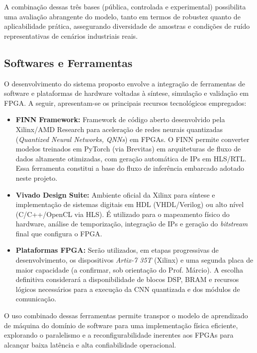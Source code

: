 A combinação dessas três bases (pública, controlada e experimental) possibilita uma avaliação abrangente do modelo, tanto em termos de robustez quanto de aplicabilidade prática, assegurando diversidade de amostras e condições de ruído representativas de cenários industriais reais.

\subsection*{Softwares e Ferramentas}

O desenvolvimento do sistema proposto envolve a integração de ferramentas de software e plataformas de hardware voltadas à síntese, simulação e validação em FPGA. A seguir, apresentam-se os principais recursos tecnológicos empregados:

\begin{itemize}
    \item \textbf{FINN Framework:}  
    Framework de código aberto desenvolvido pela Xilinx/AMD Research para aceleração de redes neurais quantizadas (\textit{Quantized Neural Networks, QNNs}) em FPGAs. O FINN permite converter modelos treinados em PyTorch (via Brevitas) em arquiteturas de fluxo de dados altamente otimizadas, com geração automática de IPs em HLS/RTL. Essa ferramenta constitui a base do fluxo de inferência embarcado adotado neste projeto.

    \item \textbf{Vivado Design Suite:}  
    Ambiente oficial da Xilinx para síntese e implementação de sistemas digitais em HDL (VHDL/Verilog) ou alto nível (C/C++/OpenCL via HLS). É utilizado para o mapeamento físico do hardware, análise de temporização, integração de IPs e geração do \textit{bitstream} final que configura o FPGA.

    \item \textbf{Plataformas FPGA:}  
    Serão utilizados, em etapas progressivas de desenvolvimento, os dispositivos \textit{Artix-7 35T} (Xilinx) e uma segunda placa de maior capacidade (a confirmar, sob orientação do Prof. Márcio). A escolha definitiva considerará a disponibilidade de blocos DSP, BRAM e recursos lógicos necessários para a execução da CNN quantizada e dos módulos de comunicação.
\end{itemize}

O uso combinado dessas ferramentas permite transpor o modelo de aprendizado de máquina do domínio de software para uma implementação física eficiente, explorando o paralelismo e a reconfigurabilidade inerentes aos FPGAs para alcançar baixa latência e alta confiabilidade operacional.

